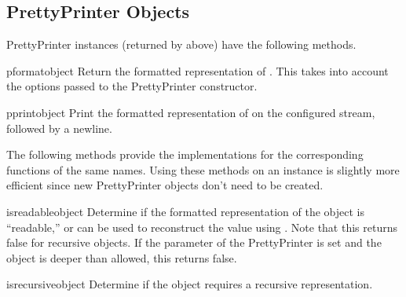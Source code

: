 \subsection{PrettyPrinter Objects}

PrettyPrinter instances (returned by  above)
have the following methods.


\begin{funcdesc}{pformat}{object}
Return the formatted representation of .  This takes into
account the options passed to the PrettyPrinter constructor.
\end{funcdesc}

\begin{funcdesc}{pprint}{object}
Print the formatted representation of  on the configured
stream, followed by a newline.
\end{funcdesc}

The following methods provide the implementations for the
corresponding functions of the same names.  Using these methods on an
instance is slightly more efficient since new PrettyPrinter objects
don't need to be created.

\begin{funcdesc}{isreadable}{object}
Determine if the formatted representation of the object is
``readable,'' or can be used to reconstruct the value using
.  Note that this returns false for recursive objects.
If the  parameter of the PrettyPrinter is set and the
object is deeper than allowed, this returns false.
\end{funcdesc}

\begin{funcdesc}{isrecursive}{object}
Determine if the object requires a recursive representation.
\end{funcdesc}
